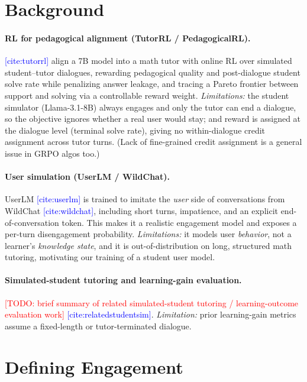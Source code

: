\documentclass[11pt]{article}
\newcommand{\cit}[1]{\textcolor{blue}{[\textsf{cite:#1}]}}
\newcommand{\todo}[1]{\textcolor{red}{[TODO: #1]}}
\begin{document}
\section{Background}
\label{sec:background}

\paragraph{RL for pedagogical alignment (TutorRL / PedagogicalRL).}
\cit{tutorrl} align a 7B model into a math tutor with online RL over simulated
student--tutor dialogues, rewarding pedagogical quality and post-dialogue student
solve rate while penalizing answer leakage, and tracing a Pareto frontier between
support and solving via a controllable reward weight. \emph{Limitations:} the
student simulator (Llama-3.1-8B) always engages and only the tutor can end a
dialogue, so the objective ignores whether a real user would stay; and reward is
assigned at the dialogue level (terminal solve rate), giving no within-dialogue
credit assignment across tutor turns. (Lack of fine-grained credit assignment is a general issue in GRPO algos too.)

\paragraph{User simulation (UserLM / WildChat).}
UserLM \cit{userlm} is trained to imitate the \emph{user} side of conversations
from WildChat \cit{wildchat}, including short turns, impatience, and an explicit
end-of-conversation token. This makes it a realistic engagement model and exposes
a per-turn disengagement probability. \emph{Limitations:} it models user
\emph{behavior}, not a learner's \emph{knowledge state}, and it is
out-of-distribution on long, structured math tutoring, motivating our training of a student user model.

\paragraph{Simulated-student tutoring and learning-gain evaluation.}
\todo{brief summary of related simulated-student tutoring / learning-outcome
evaluation work} \cit{relatedstudentsim}. \emph{Limitation:} prior learning-gain
metrics assume a fixed-length or tutor-terminated dialogue.

\section{Defining Engagement}
\end{document}
